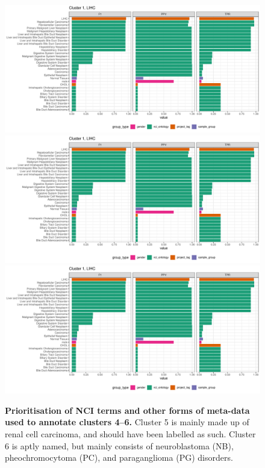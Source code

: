 \begin{figure}[H]
	\centering
	\includegraphics[width=.95\linewidth,page=4]{fig/tcga/cluster_labelling.pdf}
	\includegraphics[width=.95\linewidth,page=5]{fig/tcga/cluster_labelling.pdf}
	\includegraphics[width=.95\linewidth,page=6]{fig/tcga/cluster_labelling.pdf}
	\caption{
		\textbf{Prioritisation of NCI terms and other forms of meta-data used to annotate clusters 4--6.} Cluster 5 is mainly made up of renal cell carcinoma, and should have been labelled as such. Cluster 6 is aptly named, but mainly consists of neuroblastoma (NB), pheochromocytoma (PC), and paraganglioma (PG) disorders.
	}
	\label{fig:cluslab2}
\end{figure}

